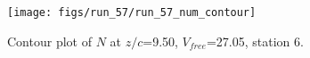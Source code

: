 \begin{figure}[H]
\centering
\texttt{[image: figs/run\_57/run\_57\_num\_contour]}
\caption{Contour plot of $N$ at $z/c$=9.50, $V_{free}$=27.05, station 6.}
\label{fig:run_57_num_contour}
\end{figure}


